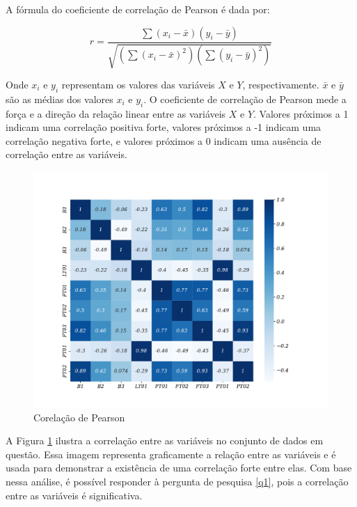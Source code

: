 A fórmula do coeficiente de correlação de Pearson é dada por:

\begin{equation}
	r=\frac{\sum\left(x_i-\bar{x}\right)\left(y_i-\bar{y}\right)}{\sqrt{\left(\sum\left(x_i-\bar{x}\right)^2\right)\left(\sum\left(y_i-\bar{y}\right)^2\right)}}
\end{equation}

Onde $x_i$ e $y_i$ representam os valores das variáveis $X$ e $Y$, respectivamente. $\bar{x}$ e $\bar{y}$ são as médias dos valores $x_i$ e $y_i$. O coeficiente de correlação de Pearson mede a força e a direção da relação linear entre as variáveis $X$ e $Y$. Valores próximos a 1 indicam uma correlação positiva forte, valores próximos a -1 indicam uma correlação negativa forte, e valores próximos a 0 indicam uma ausência de correlação entre as variáveis.

\begin{figure}[H]
	\centering
	\caption{Corelação de Pearson}
	\label{fig:person}
	\includegraphics[width=1\linewidth]{Apendices/Figuras/modelagem-24h/person}
	
\end{figure}

A Figura \ref{fig:person} ilustra a correlação entre as variáveis no conjunto de dados em questão. Essa imagem representa graficamente a relação entre as variáveis e é usada para demonstrar a existência de uma correlação forte entre elas. Com base nessa análise, é possível responder à pergunta de pesquisa \ref{q1}, pois a correlação entre as variáveis é significativa.

